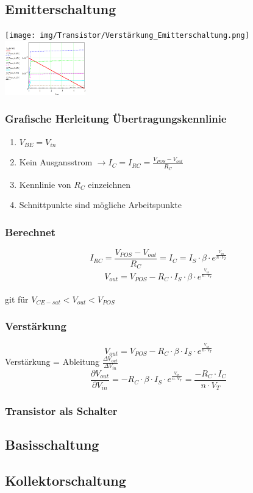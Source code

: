 \documentclass[margin=normal]{tex/hsrzf}
\begin{document}
\begin{multicols*}{2}
    \subsection{Emitterschaltung}
    \texttt{[image: img/Transistor/Verstärkung\_Emitterschaltung.png]}
    \includegraphics[width = 3.5cm]{img/Transistor/Uebertragungskennlinie.png}
    \subsubsection*{Grafische Herleitung Übertragungskennlinie}
    \begin{enumerate}
      \item $V_{BE} = V_{in}$
      \item Kein Ausgansstrom $\rightarrow I_C = I_{RC} = \frac{V_{POS} - V_{out}}{R_C}$
      \item Kennlinie von $R_C$ einzeichnen
      \item Schnittpunkte sind mögliche Arbeitspunkte
    \end{enumerate}
    \subsubsection*{Berechnet}
    $$I_{RC} = \frac{V_{POS} - V_{out}}{R_C} = I_C = I_S \cdot \beta \cdot e^{\frac{V_{in}}{n \cdot V_T}}$$
    $$V_{out} = V_{POS}-R_C \cdot  I_S \cdot \beta \cdot e^{\frac{V_{in}}{n \cdot V_T}}$$
    {\\ \tiny git für $V_{CE-sat} < V_{out} < V_{POS}$}
    \subsubsection*{Verstärkung}
    $$V_{out} = V_{POS} - R_C \cdot \beta \cdot I_S \cdot e^{\frac{V_{in}}{n \cdot V_T}}$$
    Verstärkung = Ableitung $\frac{\Delta V_{out}}{\Delta V_{in}}$
    $$\frac{\partial V_{out}}{\partial V_{in}} =- R_C \cdot \beta \cdot I_S \cdot e^{\frac{V_{in}}{n \cdot V_T}} = \frac{-R_C \cdot I_C}{n \cdot V_T} $$
    
    \subsubsection{Transistor als Schalter}

    \subsection{Basisschaltung}

    \subsection{Kollektorschaltung}


  \end{multicols*}
    
\end{document}
